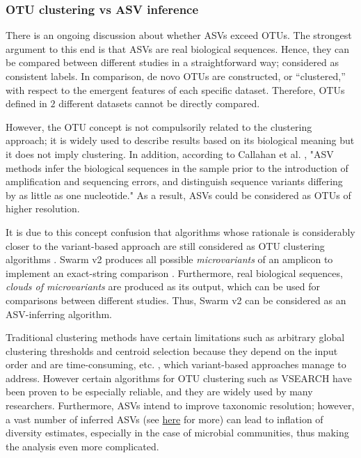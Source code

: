    \subsubsection*{OTU clustering vs ASV inference}
   \label{subsec:otu-asv}

   There is an ongoing discussion about whether ASVs exceed OTUs. 
   The strongest argument to this end is that ASVs are real biological sequences. 
   Hence, they can be compared between different studies in a straightforward way; 
   considered as consistent labels. 
   In comparison, de novo OTUs are constructed, or “clustered,” with respect to the emergent features of each specific dataset. 
   Therefore, OTUs defined in $2$ different datasets cannot be directly compared.

   However, the OTU concept is not compulsorily related to the clustering approach; 
   it is widely used to describe results based on its biological meaning but it does not imply clustering. 
   In addition, according to Callahan et al. \citep{callahan2017exact}, "ASV methods infer the biological sequences in the sample prior to the introduction of amplification and sequencing errors, and distinguish sequence variants differing by as little as one nucleotide." 
   As a result, ASVs could be considered as OTUs of higher resolution.

   It is due to this concept confusion that algorithms whose rationale is considerably closer to the variant-based approach are still considered as OTU clustering algorithms \citep{callahan2017exact}. 
   Swarm v2 produces all possible \textit{microvariants} of an amplicon to implement an exact-string comparison \citep{mahe2015swarm}. 
   Furthermore, real biological sequences, \textit{clouds of microvariants} are produced as its output, which can be used for comparisons between different studies. Thus, Swarm v2 can be considered as an ASV-inferring algorithm.

   Traditional clustering methods have certain limitations such as arbitrary global clustering thresholds and centroid selection because they depend on the input order and are time-consuming, etc. \citep{mahe2014swarm}, which variant-based approaches manage to address. 
   However certain algorithms for OTU clustering such as VSEARCH have been proven to be especially reliable, and they are widely used by many researchers. 
   Furthermore, ASVs intend to improve taxonomic resolution; however, a vast number of inferred ASVs (see \href{http://fiererlab.org/2017/05/02/lumping-versus-splitting-is-it-time-for-microbial-ecologists-to-abandon-otus/}{here} for more) can lead to inflation of diversity estimates, especially in the case of microbial communities, thus making the analysis even more complicated.

